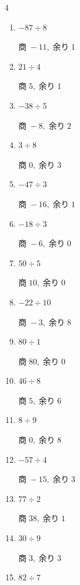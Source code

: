 \begin{multicols}{4}
\begin{enumerate}
        $商\; -3,\; 余り\; 3$

  \item $-87 \div 8$

        $商\; -11,\; 余り\; 1$

  \item $21 \div 4$

        $商\; 5,\; 余り\; 1$

  \item $-38 \div 5$

        $商\; -8,\; 余り\; 2$

  \item $3 \div 8$

        $商\; 0,\; 余り\; 3$

\columnbreak %

  \item $-47 \div 3$

        $商\; -16,\; 余り\; 1$

  \item $-18 \div 3$

        $商\; -6,\; 余り\; 0$

  \item $50 \div 5$

        $商\; 10,\; 余り\; 0$

  \item $-22 \div 10$

        $商\; -3,\; 余り\; 8$

  \item $80 \div 1$

        $商\; 80,\; 余り\; 0$

  \item $46 \div 8$

        $商\; 5,\; 余り\; 6$

  \item $8 \div 9$

        $商\; 0,\; 余り\; 8$

  \item $-57 \div 4$

        $商\; -15,\; 余り\; 3$

  \item $77 \div 2$

        $商\; 38,\; 余り\; 1$

  \item $30 \div 9$

        $商\; 3,\; 余り\; 3$

  \item $82 \div 7$


\end{enumerate}
\end{multicols}
